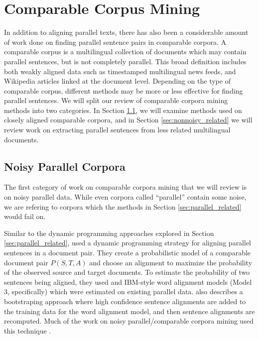 \section{Comparable Corpus Mining}
\label{sec:comparable_related}

In addition to aligning parallel texts, there has also been a considerable
amount of work done on finding parallel sentence pairs in comparable corpora. A
comparable corpus is a multilingual collection of documents which may contain
parallel sentences, but is not completely parallel. This broad definition
includes both weakly aligned data such as timestamped multilingual news feeds,
and Wikipedia articles linked at the document level. Depending on the type of
comparable corpus, different methods may be more or less effective for finding
parallel sentences. We will split our review of comparable corpora mining
methods into two categories. In Section \ref{sec:noisy_related}, we will examine
methods used on closely aligned comparable corpora, and in Section
\ref{sec:nonnoisy_related} we will review work on extracting parallel sentences
from less related multilingual documents.

\subsection{Noisy Parallel Corpora}
\label{sec:noisy_related}
The first category of work on comparable corpora mining that we will review is
on noisy parallel data. While even corpora called ``parallel'' contain some
noise, we are refering to corpora which the methods in Section
\ref{sec:parallel_related} would fail on.

Similar to the dynamic programming approaches explored in Section
\ref{sec:parallel_related}, \citet{Zhao02} used a dynamic programming strategy
for aligning parallel sentences in a document pair. They create a probabilistic
model of a comparable document pair $P(S,T,A)$ and choose an alignment to
maximize the probability of the observed source and target documents. To
estimate the probability of two sentences being aligned, they used and IBM-style 
word alignment models (Model 3, specifically) which were estimated on existing
parallel data. \citet{Zhao02} also describes a bootstraping approach where high
confidence sentence alignments are added to the training data for the word
alignment model, and then sentence alignments are recomputed. Much of the work
on noisy parallel/comparable corpora mining used this technique 
\citep{Fung04a,Fung04b,Wu05,Munteanu05}.

